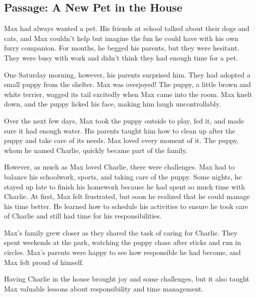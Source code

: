\documentclass[12pt]{article}
\begin{document}
\onehalfspacing

\subsection*{Passage: A New Pet in the House}

\begin{tcolorbox}[colframe=black!40, colback=gray!5]
\begin{spacing}{1.15}
    Max had always wanted a pet. His friends at school talked about their dogs and cats, and Max couldn't help but imagine the fun he could have with his own furry companion. For months, he begged his parents, but they were hesitant. They were busy with work and didn't think they had enough time for a pet. 

    One Saturday morning, however, his parents surprised him. They had adopted a small puppy from the shelter. Max was overjoyed! The puppy, a little brown and white terrier, wagged its tail excitedly when Max came into the room. Max knelt down, and the puppy licked his face, making him laugh uncontrollably. 

    Over the next few days, Max took the puppy outside to play, fed it, and made sure it had enough water. His parents taught him how to clean up after the puppy and take care of its needs. Max loved every moment of it. The puppy, whom he named Charlie, quickly became part of the family.

    However, as much as Max loved Charlie, there were challenges. Max had to balance his schoolwork, sports, and taking care of the puppy. Some nights, he stayed up late to finish his homework because he had spent so much time with Charlie. At first, Max felt frustrated, but soon he realized that he could manage his time better. He learned how to schedule his activities to ensure he took care of Charlie and still had time for his responsibilities.

    Max's family grew closer as they shared the task of caring for Charlie. They spent weekends at the park, watching the puppy chase after sticks and run in circles. Max’s parents were happy to see how responsible he had become, and Max felt proud of himself. 

    Having Charlie in the house brought joy and some challenges, but it also taught Max valuable lessons about responsibility and time management.
\end{spacing}
\end{tcolorbox}

\end{document}
